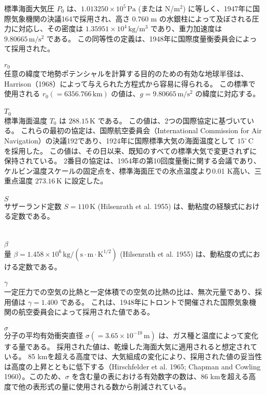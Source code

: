 \documentclass{article}
\begin{document}
標準海面大気圧 $P_0$ は、$1.013250 \times 10^{5} \, \mathrm{Pa}$ (または N/m$^2$) に等しく、1947年に国際気象機関の決議164で採用され、高さ 0.760 m の水銀柱によって及ぼされる圧力に対応し、その密度は $1.35951 \times 10^{4} \, \mathrm{kg/m^3}$ であり、重力加速度は $9.80665 \, \mathrm{m/s^2}$ である。
この同等性の定義は、1948年に国際度量衡委員会によって採用された。\\
\\$r_0$\\
任意の緯度で地勢ポテンシャルを計算する目的のための有効な地球半径は、Harrison（1968）によって与えられた方程式から容易に得られる。
この標準で使用される $r_0 (= 6356.766 \, \mathrm{km})$ の値は、$g = 9.80665 \, \mathrm{m/s^2}$ の緯度に対応する。\\
\\$T_0$\\
標準海面温度 $T_0$ は $288.15 \, \mathrm{K}$ である。
この値は、2つの国際協定に基づいている。
これらの最初の協定は、国際航空委員会（International Commission for Air Navigation）の決議192であり、1924年に国際標準大気の海面温度として $15^\circ \, \mathrm{C}$ を採用した。
この値は、その日以来、既知のすべての標準大気で変更されずに保持されている。
2番目の協定は、1954年の第10回度量衡に関する会議であり、ケルビン温度スケールの固定点を、標準海面圧での氷点温度より0.01 K高い、三重点温度 $273.16 \, \mathrm{K}$ に設定した。\\
\\$S$\\
サザーランド定数 $S = 110 \, \mathrm{K}$ (Hilsenrath et al. 1955) は、動粘度の経験式における定数である。\\\\
\\$\beta$\\
量 $\beta = 1.458 \times 10^{6} \, \mathrm{kg/(s \cdot m \cdot K^{1/2})}$ (Hilsenrath et al. 1955) は、動粘度の式における定数である。\\
\\$\gamma$\\
一定圧力での空気の比熱と一定体積での空気の比熱の比は、無次元量であり、採用値は $\gamma = 1.400$ である。
これは、1948年にトロントで開催された国際気象機関の航空委員会によって採用された値である。\\
\\$\sigma$\\
分子の平均有効衝突直径 $\sigma (= 3.65 \times 10^{-10} \, \mathrm{m})$ は、ガス種と温度によって変化する量である。
採用された値は、乾燥した海面大気に適用されると想定されている。
85 kmを超える高度では、大気組成の変化により、採用された値の妥当性は高度の上昇とともに低下する（Hirschfelder et al. 1965; Chapman and Cowling 1960）。このため、$\sigma$ を含む量の表における有効数字の数は、86 kmを超える高度で他の表形式の量に使用される数から削減されている。
\end{document}
